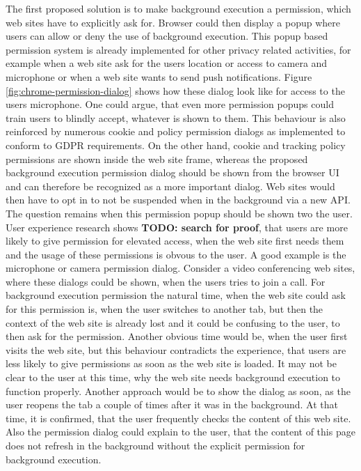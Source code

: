 \documentclass[
	ngerman,
	ruledheaders=section,%
	class=report,%
	thesis={type=bachelor},%
	accentcolor=9c,%
	custommargins=true,%
	marginpar=false,%
	parskip=half-,%
	fontsize=11pt,%
]{tudapub}
\begin{document}
  The first proposed solution is to make background execution a permission, which web sites have to explicitly ask for. Browser could then display a popup where users can allow or deny the use of background execution. This popup based permission system is already implemented for other privacy related activities, for example when a web site ask for the users location or access to camera and microphone or when a web site wants to send push notifications. Figure \ref{fig:chrome-permission-dialog} shows how these dialog look like for access to the users microphone. One could argue, that even more permission popups could train users to blindly accept, whatever is shown to them. This behaviour is also reinforced by numerous cookie and policy permission dialogs as implemented to conform to GDPR requirements. On the other hand, cookie and tracking policy permissions are shown inside the web site frame, whereas the proposed background execution permission dialog should be shown from the browser UI and can therefore be recognized as a more important dialog. Web sites would then have to opt in to not be suspended when in the background via a new API. The question remains when this permission popup should be shown two the user. User experience research shows \textbf{TODO: search for proof}, that users are more likely to give permission for elevated access, when the web site first needs them and the usage of these permissions is obvous to the user. A good example is the microphone or camera permission dialog. Consider a video conferencing web sites, where these dialogs could be shown, when the users tries to join a call. For background execution permission the natural time, when the web site could ask for this permission is, when the user switches to another tab, but then the context of the web site is already lost and it could be confusing to the user, to then ask for the permission. Another obvious time would be, when the user first visits the web site, but this behaviour contradicts the experience, that users are less likely to give permissions as soon as the web site is loaded. It may not be clear to the user at this time, why the web site needs background execution to function properly. Another approach would be to show the dialog as soon, as the user reopens the tab a couple of times after it was in the background. At that time, it is confirmed, that the user frequently checks the content of this web site. Also the permission dialog could explain to the user, that the content of this page does not refresh in the background without the explicit permission for background execution.
\end{document}
